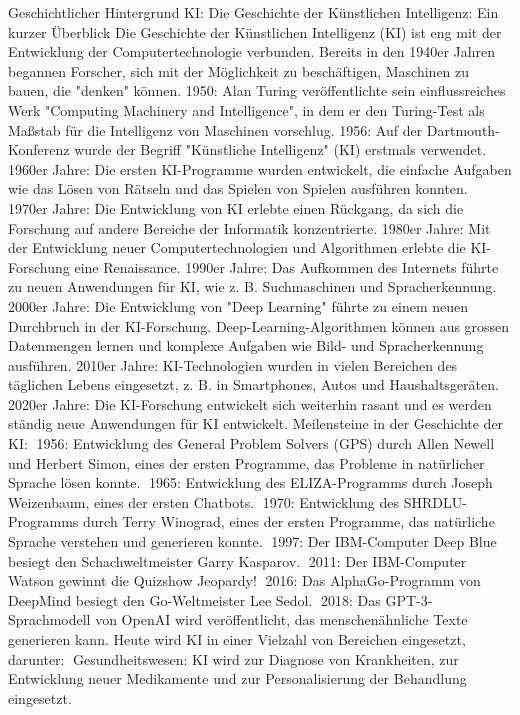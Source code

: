 Geschichtlicher Hintergrund KI:
Die Geschichte der Künstlichen Intelligenz: Ein kurzer Überblick
Die Geschichte der Künstlichen Intelligenz (KI) ist eng mit der Entwicklung der Computertechnologie verbunden. Bereits in den 1940er Jahren begannen Forscher, sich mit der Möglichkeit zu beschäftigen, Maschinen zu bauen, die "denken" können.
1950: Alan Turing veröffentlichte sein einflussreiches Werk "Computing Machinery and Intelligence", in dem er den Turing-Test als Maßstab für die Intelligenz von Maschinen vorschlug.
1956: Auf der Dartmouth-Konferenz wurde der Begriff "Künstliche Intelligenz" (KI) erstmals verwendet.
1960er Jahre: Die ersten KI-Programme wurden entwickelt, die einfache Aufgaben wie das Lösen von Rätseln und das Spielen von Spielen ausführen konnten.
1970er Jahre: Die Entwicklung von KI erlebte einen Rückgang, da sich die Forschung auf andere Bereiche der Informatik konzentrierte.
1980er Jahre: Mit der Entwicklung neuer Computertechnologien und Algorithmen erlebte die KI-Forschung eine Renaissance.
1990er Jahre: Das Aufkommen des Internets führte zu neuen Anwendungen für KI, wie z. B. Suchmaschinen und Spracherkennung.
2000er Jahre: Die Entwicklung von "Deep Learning" führte zu einem neuen Durchbruch in der KI-Forschung. Deep-Learning-Algorithmen können aus grossen Datenmengen lernen und komplexe Aufgaben wie Bild- und Spracherkennung ausführen.
2010er Jahre: KI-Technologien wurden in vielen Bereichen des täglichen Lebens eingesetzt, z. B. in Smartphones, Autos und Haushaltsgeräten.
2020er Jahre: Die KI-Forschung entwickelt sich weiterhin rasant und es werden ständig neue Anwendungen für KI entwickelt.
Meilensteine in der Geschichte der KI:
1956: Entwicklung des General Problem Solvers (GPS) durch Allen Newell und Herbert Simon, eines der ersten Programme, das Probleme in natürlicher Sprache lösen konnte.
1965: Entwicklung des ELIZA-Programms durch Joseph Weizenbaum, eines der ersten Chatbots.
1970: Entwicklung des SHRDLU-Programms durch Terry Winograd, eines der ersten Programme, das natürliche Sprache verstehen und generieren konnte.
1997: Der IBM-Computer Deep Blue besiegt den Schachweltmeister Garry Kasparov.
2011: Der IBM-Computer Watson gewinnt die Quizshow Jeopardy!
2016: Das AlphaGo-Programm von DeepMind besiegt den Go-Weltmeister Lee Sedol.
2018: Das GPT-3-Sprachmodell von OpenAI wird veröffentlicht, das menschenähnliche Texte generieren kann.
Heute wird KI in einer Vielzahl von Bereichen eingesetzt, darunter:
Gesundheitswesen: KI wird zur Diagnose von Krankheiten, zur Entwicklung neuer Medikamente und zur Personalisierung der Behandlung eingesetzt.
